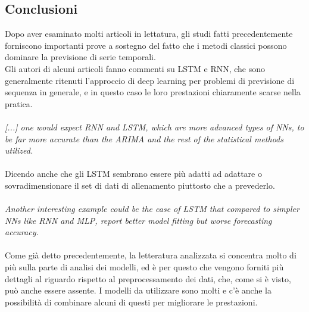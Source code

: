 \documentclass[12pt,a4paper]{report}
\begin{document}
\subsection{Conclusioni}
Dopo aver esaminato molti articoli in lettatura, gli studi fatti precedentemente forniscono importanti prove a sostegno del fatto che i metodi classici possono dominare la previsione di serie temporali.\\
Gli autori di alcuni articoli fanno commenti su LSTM e RNN, che sono generalmente ritenuti l'approccio di deep learning per problemi di previsione di sequenza in generale, e in questo caso le loro prestazioni chiaramente scarse nella pratica.\\
\\
\emph{[...] one would expect RNN and LSTM, which are more advanced types of NNs, to be far more accurate than the ARIMA and the rest of the statistical methods utilized.} \cite{makridakis2018statistical}\\
\\
Dicendo anche che gli LSTM sembrano essere più adatti ad adattare o sovradimensionare il set di dati di allenamento piuttosto che a prevederlo.\\
\\
\emph{Another interesting example could be the case of LSTM that compared to simpler NNs like RNN and MLP, report better model fitting but worse forecasting accuracy.} \cite{makridakis2018statistical}\\
\\
Come già detto precedentemente, la letteratura analizzata si concentra molto di più sulla parte di analisi dei modelli, ed è per questo che vengono forniti più dettagli al riguardo rispetto al preprocessamento dei dati, che, come si è visto, può anche essere assente. I modelli da utilizzare sono molti e c'è anche la possibilità di combinare alcuni di questi per migliorare le prestazioni.\\
\end{document}
